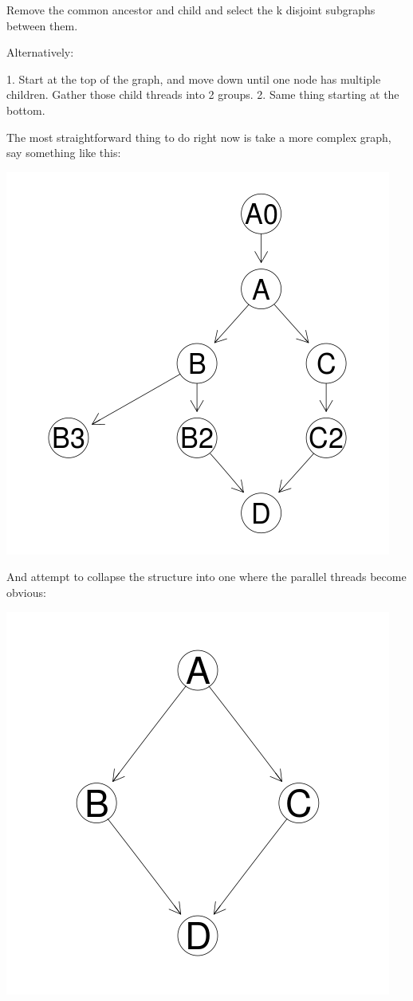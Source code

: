 \documentclass[12pt]{article}
\begin{document}
Remove the common ancestor and child and select the k disjoint subgraphs
between them.

Alternatively:

1. Start at the top of the graph, and move down until one node has
multiple children. Gather those child threads into 2 groups.
2. Same thing starting at the bottom.

The most straightforward thing to do right now is take a more complex
graph, say something like this:

\centerline{\includegraphics{../codedepends/larger_graph.png}}


And attempt to collapse the structure into one where the parallel threads
become obvious:

\centerline{\includegraphics{../codedepends/simple_graph.png}}
\end{document}
